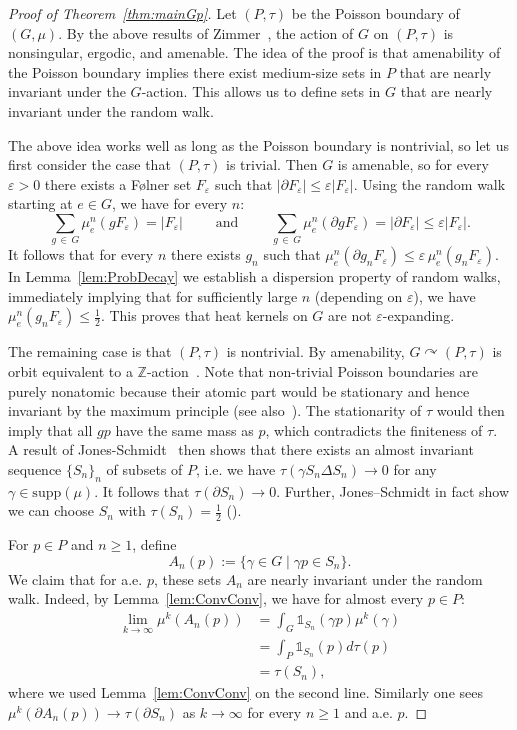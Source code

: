 \documentclass[AHL,Unicode,longabstracts,published]{cedram}
\newcommand{\bbZ}{\mathbb{Z}}
\newcommand{\bbone}{\mathds{1}}
\begin{document}
\begin{proof}[{Proof of Theorem~\ref{thm:mainGp}}]
Let $(P,\tau)$ be the Poisson boundary of $(G,\mu)$. By the above results of Zimmer~\cite{Zimmer78}, the action of $G$ on $(P,\tau)$ is nonsingular, ergodic, and amenable. The idea of the proof is that amenability of the Poisson boundary implies there exist medium-size sets in $P$ that are nearly invariant under the $G$-action. This allows us to define sets in $G$ that are nearly invariant under the random walk.

The above idea works well as long as the Poisson boundary is nontrivial, so let us first consider the case that $(P,\tau)$ is trivial. Then $G$ is amenable, so for every $\varepsilon>0$ there exists a F{\o}lner set $F_\varepsilon$ such that $|\partial F_\varepsilon|\leq \varepsilon|F_\varepsilon|$. Using the random walk starting at $e\in G$, we have for every $n$:
\[
\sum_{g\,\in\,G} \mu_e^n(gF_\varepsilon)= |F_\varepsilon| \qquad \text{ and } \qquad \sum_{g\,\in\,G} \mu_e^n(\partial gF_\varepsilon)=|\partial F_\varepsilon|\leq \varepsilon|F_\varepsilon|.
\]
It follows that for every $n$ there exists $g_n$ such that $\mu_e^n(\partial g_n F_\varepsilon)\leq \varepsilon \, \mu_e^n(g_n F_\varepsilon)$. In Lemma~\ref{lem:ProbDecay} we establish a dispersion property of random walks, immediately implying that for sufficiently large $n$ (depending on $\varepsilon$), we have $\mu_e^n(g_n F_\varepsilon)\leq \frac{1}{2}$. This proves that heat kernels on $G$ are not $\varepsilon$-expanding.

The remaining case is that $(P,\tau)$ is nontrivial. By amenability, $G\curvearrowright (P,\tau)$ is orbit equivalent to a $\bbZ$-action~\cite{ConnesFeldmanWeiss}. Note that non-trivial Poisson boundaries are purely nonatomic because their atomic part would be stationary and hence invariant by the maximum principle (see also~\cite[Corollary~3.3.1]{Kai05}). The stationarity of $\tau$ would then imply that all $gp$ have the same mass as $p$, which contradicts the finiteness of $\tau$. A result of Jones-Schmidt~\cite{JonesSchmidt} then shows that there exists an almost invariant sequence $\{S_n\}_n$ of subsets of $P$, i.e. we have $\tau(\gamma S_n \Delta S_n)\to 0$ for any $\gamma\in\text{supp}(\mu)$. It follows that $\tau(\partial S_n)\to 0$. Further, Jones--Schmidt in fact show we can choose $S_n$ with $\tau(S_n)=\frac{1}{2}$ (\cite[Lemma~2.3]{JonesSchmidt}).

For $p\in P$ and $n\geq 1$, define
\[
A_n(p):= \{\gamma\in G\mid \gamma p \in S_n\}.
\]
We claim that for a.e. $p$, these sets $A_n$ are nearly invariant under the random walk. Indeed, by Lemma~\ref{lem:ConvConv}, we have for almost every $p\in P$:
\begin{align*}
\lim_{k\to\infty} \mu^k(A_n(p))&=\int_G \bbone_{S_n}(\gamma p) \mu^k(\gamma)\\
&=\int_P \bbone_{S_n}(p) d\tau(p)\\
&=\tau(S_n),
\end{align*}
where we used Lemma~\ref{lem:ConvConv} on the second line. Similarly one sees $\mu^k(\partial A_n(p))\to \tau(\partial S_n)$ as $k\to\infty$ for every $n\geq 1$ and a.e. $p$.
\end{proof}
\end{document}
